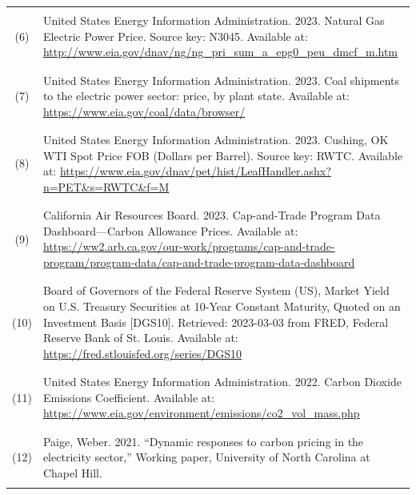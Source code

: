 \begin{center}
\begin{longtable}{c L{0.8\textwidth}}
        \hline \\[-3ex]
        (6) & United States Energy Information Administration. 2023. Natural Gas Electric Power Price. Source key: N3045. Available at: \url{http://www.eia.gov/dnav/ng/ng_pri_sum_a_epg0_peu_dmcf_m.htm} \\ \\[-3ex]
        \hline \\[-3ex]
        (7) & United States Energy Information Administration. 2023. Coal shipments to the electric power sector: price, by plant state. Available at: \url{https://www.eia.gov/coal/data/browser/} \\ \\[-3ex]
        \hline \\[-3ex]
        (8) & United States Energy Information Administration. 2023. Cushing, OK WTI Spot Price FOB (Dollars per Barrel). Source key: RWTC. Available at: \url{https://www.eia.gov/dnav/pet/hist/LeafHandler.ashx?n=PET&s=RWTC&f=M} \\ \\[-3ex]
        \hline \\[-3ex]
        (9) & California Air Resources Board. 2023. Cap-and-Trade Program Data Dashboard---Carbon Allowance Prices. Available at: \url{https://ww2.arb.ca.gov/our-work/programs/cap-and-trade-program/program-data/cap-and-trade-program-data-dashboard} \\ \\[-3ex]
        \hline \\[-3ex]
        (10) & Board of Governors of the Federal Reserve System (US), Market Yield on U.S. Treasury Securities at 10-Year Constant Maturity, Quoted on an Investment Basis [DGS10]. Retrieved: 2023-03-03 from FRED, Federal Reserve Bank of St. Louis. Available at: \url{https://fred.stlouisfed.org/series/DGS10} \\ \\[-3ex]
        \hline \\[-3ex]
        (11) & United States Energy Information Administration. 2022. Carbon Dioxide Emissions Coefficient. Available at: \url{https://www.eia.gov/environment/emissions/co2_vol_mass.php}\\ \\[-3ex]
        \hline \\[-3ex]
        (12) & Paige, Weber. 2021. ``Dynamic responses to carbon pricing in the electricity sector,'' Working paper, University of North Carolina at Chapel Hill.\\ \\[-3ex]
        \hline\hline
    \end{longtable}
\end{center}

